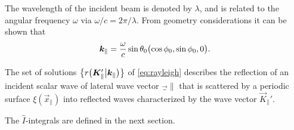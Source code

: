 The wavelength of the incident beam is denoted by $\lambda$, and is related to the angular frequency $\omega$ via $\omega/c = 2\pi/\lambda$. From geometry considerations it can be shown that
\begin{equation}
    \vec k_\| = \frac{\omega}{c}\sin\theta_0 \del[1]{\cos\phi_0, \sin\phi_0, 0}.
\end{equation}

The set of solutions $\cbr[1]{r\del[1]{\vec K_{\|}'\big\vert \vec k_{\|}}}$ of \cref{eq:rayleigh} describes the reflection of an incident scalar wave of lateral wave vector $\vec_\|$ that is scattered by a periodic surface $\xi(\vec x_\|)$ into reflected waves characterized by the wave vector $\vec K_\|'$.

The $\hat I$-integrals are defined in the next section.

